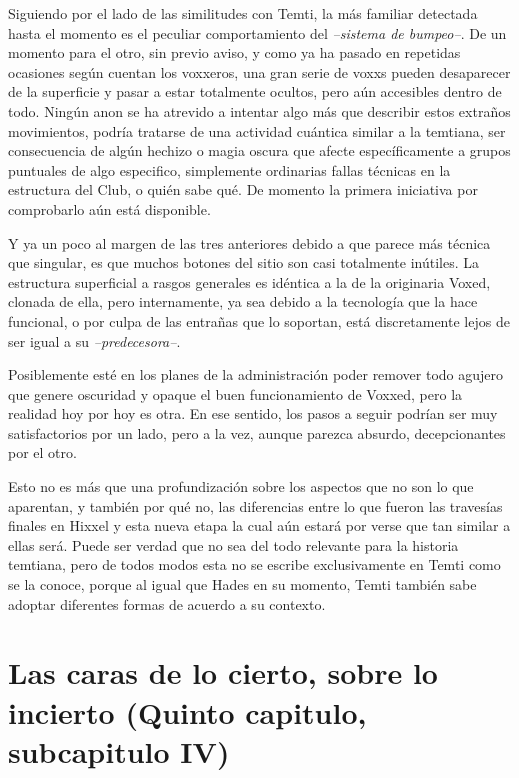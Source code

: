 \documentclass[
  spanish,
]{book}
\begin{document}
Siguiendo por el lado de las similitudes con Temti, la más familiar detectada hasta el momento es el peculiar comportamiento del \emph{--sistema de bumpeo--}. De un momento para el otro, sin previo aviso, y como ya ha pasado en repetidas ocasiones según cuentan los voxxeros, una gran serie de voxxs pueden desaparecer de la superficie y pasar a estar totalmente ocultos, pero aún accesibles dentro de todo. Ningún anon se ha atrevido a intentar algo más que describir estos extraños movimientos, podría tratarse de una actividad cuántica similar a la temtiana, ser consecuencia de algún hechizo o magia oscura que afecte específicamente a grupos puntuales de algo especifico, simplemente ordinarias fallas técnicas en la estructura del Club, o quién sabe qué. De momento la primera iniciativa por comprobarlo aún está disponible.

Y ya un poco al margen de las tres anteriores debido a que parece más técnica que singular, es que muchos botones del sitio son casi totalmente inútiles. La estructura superficial a rasgos generales es idéntica a la de la originaria Voxed, clonada de ella, pero internamente, ya sea debido a la tecnología que la hace funcional, o por culpa de las entrañas que lo soportan, está discretamente lejos de ser igual a su \emph{--predecesora--}.

Posiblemente esté en los planes de la administración poder remover todo agujero que genere oscuridad y opaque el buen funcionamiento de Voxxed, pero la realidad hoy por hoy es otra. En ese sentido, los pasos a seguir podrían ser muy satisfactorios por un lado, pero a la vez, aunque parezca absurdo, decepcionantes por el otro.

Esto no es más que una profundización sobre los aspectos que no son lo que aparentan, y también por qué no, las diferencias entre lo que fueron las travesías finales en Hixxel y esta nueva etapa la cual aún estará por verse que tan similar a ellas será. Puede ser verdad que no sea del todo relevante para la historia temtiana, pero de todos modos esta no se escribe exclusivamente en Temti como se la conoce, porque al igual que Hades en su momento, Temti también sabe adoptar diferentes formas de acuerdo a su contexto.

\hypertarget{las-caras-de-lo-cierto-sobre-lo-incierto-quinto-capitulo-subcapitulo-iv}{%
\section{Las caras de lo cierto, sobre lo incierto (Quinto capitulo, subcapitulo IV)}\label{las-caras-de-lo-cierto-sobre-lo-incierto-quinto-capitulo-subcapitulo-iv}}
\end{document}
